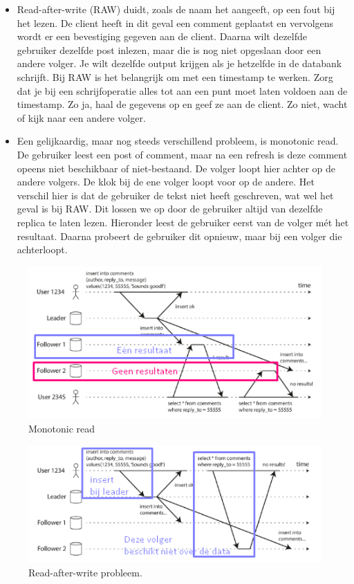 \documentclass[a4paper,10pt,twoside]{report}
\begin{document}
\begin{itemize}
	\item Read-after-write (RAW) duidt, zoals de naam het aangeeft, op een fout bij het lezen. De client heeft in dit geval een comment geplaatst en vervolgens wordt er een bevestiging gegeven aan de client. Daarna wilt dezelfde gebruiker dezelfde post inlezen, maar die is nog niet opgeslaan door een andere volger. Je wilt dezelfde output krijgen als je hetzelfde in de databank schrijft. Bij RAW is het belangrijk om met een timestamp te werken. Zorg dat je bij een schrijfoperatie alles tot aan een punt moet laten voldoen aan de timestamp. Zo ja, haal de gegevens op en geef ze aan de client. Zo niet, wacht of kijk naar een andere volger.
	\item Een gelijkaardig, maar nog steeds verschillend probleem, is monotonic read. De gebruiker leest een post of comment, maar na een refresh is deze comment opeens niet beschikbaar of niet-bestaand. De volger loopt hier achter op de andere volgers. De klok bij de ene volger loopt voor op de andere. Het verschil hier is dat de gebruiker de tekst niet heeft geschreven, wat wel het geval is bij RAW. Dit lossen we op door de gebruiker altijd van dezelfde replica te laten lezen. Hieronder leest de gebruiker eerst van de volger mét het resultaat. Daarna probeert de gebruiker dit opnieuw, maar bij een volger die achterloopt.
\end{itemize}


\begin{figure}
	\includegraphics[width=\linewidth]{../images/Screenshot_213.png}
	\caption{Monotonic read}
\end{figure}

\begin{figure}
	\includegraphics[width=\linewidth]{../images/Screenshot_214.png}
	\caption{Read-after-write probleem.}
\end{figure}
\end{document}
